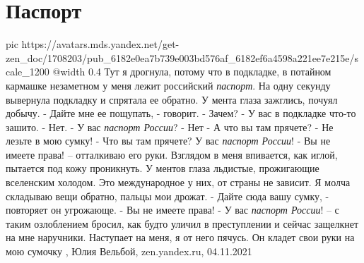  
 
 
 
 
\chapter{Паспорт}

\ifcmt
  pic https://avatars.mds.yandex.net/get-zen_doc/1708203/pub_6182e0ea7b739e003bd576af_6182ef6a4598a221ee7e215e/scale_1200
  @width 0.4
\fi
Тут я дрогнула, потому что в подкладке, в потайном кармашке незаметном у меня
лежит российский \emph{паспорт}. На одну секунду вывернула подкладку и спрятала
ее обратно. У мента глаза зажглись, почуял добычу.  - Дайте мне ее пощупать, -
говорит.  - Зачем?  - У вас в подкладке что-то зашито.  - Нет.  - У вас
\emph{паспорт России}?  - Нет - А что вы там прячете?  - Не лезьте в мою сумку!
- Что вы там прячете? У вас \emph{паспорт России}!  - Вы не имеете права! –
отталкиваю его руки.  Взглядом в меня впивается, как иглой, пытается под кожу
проникнуть. У ментов глаза льдистые, прожигающие вселенским холодом. Это
международное у них, от страны не зависит.  Я молча складываю вещи обратно,
пальцы мои дрожат.  - Дайте сюда вашу сумку, - повторяет он угрожающе.  - Вы не
имеете права!  - У вас \emph{паспорт России}! – с таким озлоблением бросил, как
будто уличил в преступлении и сейчас защелкнет на мне наручники.  Наступает на
меня, я от него пячусь. Он кладет свои руки на мою сумочку
, 
Юлия Вельбой, zen.yandex.ru, 04.11.2021 
